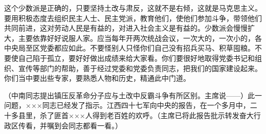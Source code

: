 这个少数派是正确的，只要坚持土改与肃反，这就不是右倾，这就是马克思主义。要用积极态度去组织民主人士、民主党派，教育他们，使他们参加斗争，带领他们共同前进，这对劳动人民是有益的，对进入社会主义是有益的。少数派会慢慢扩大，主要依靠好好说服人家。应当每年开两次统战会议，一次大的，一次小的，各中央局至区党委都应如此。不要怪别人只怪你们自己没有招兵买马、积草囤粮。不要使自己陷于孤立，要好好做出成绩来给大家看。你们要很好地取得党委书记和组织、宣传等部门的帮助，善于经过党委和党委负责同志，把我们的国家建设起来。你们当中要出些专家，要熟悉人物和历史，精通此中门道。

（中南同志提出镇压反革命分子应与土改中反霸斗争有所区别。主席说——）此一问题，×××同志已经发了指示。江西四十七军向中央的报告，在一个多月中，二十多县里，杀了匪首×××人得到老百姓的欢呼。（主席已将此报告批示转发奋大行政区传看，并嘱到会同志都看一看。）



